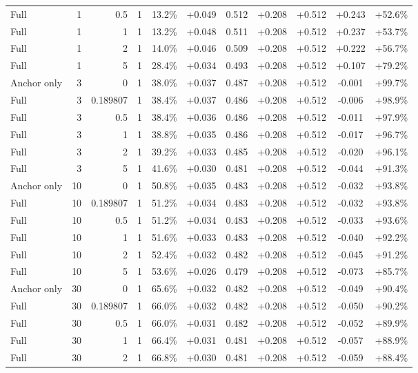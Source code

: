 \begin{table}[htbp]
\begin{tabular}{lrrrccccccc}
Full & 1 & 0.5 & 1 & 13.2\% & +0.049 & 0.512 & +0.208 & +0.512 & +0.243 & +52.6\% \\
Full & 1 & 1 & 1 & 13.2\% & +0.048 & 0.511 & +0.208 & +0.512 & +0.237 & +53.7\% \\
Full & 1 & 2 & 1 & 14.0\% & +0.046 & 0.509 & +0.208 & +0.512 & +0.222 & +56.7\% \\
Full & 1 & 5 & 1 & 28.4\% & +0.034 & 0.493 & +0.208 & +0.512 & +0.107 & +79.2\% \\
Anchor only & 3 & 0 & 1 & 38.0\% & +0.037 & 0.487 & +0.208 & +0.512 & -0.001 & +99.7\% \\
Full & 3 & 0.189807 & 1 & 38.4\% & +0.037 & 0.486 & +0.208 & +0.512 & -0.006 & +98.9\% \\
Full & 3 & 0.5 & 1 & 38.4\% & +0.036 & 0.486 & +0.208 & +0.512 & -0.011 & +97.9\% \\
Full & 3 & 1 & 1 & 38.8\% & +0.035 & 0.486 & +0.208 & +0.512 & -0.017 & +96.7\% \\
Full & 3 & 2 & 1 & 39.2\% & +0.033 & 0.485 & +0.208 & +0.512 & -0.020 & +96.1\% \\
Full & 3 & 5 & 1 & 41.6\% & +0.030 & 0.481 & +0.208 & +0.512 & -0.044 & +91.3\% \\
Anchor only & 10 & 0 & 1 & 50.8\% & +0.035 & 0.483 & +0.208 & +0.512 & -0.032 & +93.8\% \\
Full & 10 & 0.189807 & 1 & 51.2\% & +0.034 & 0.483 & +0.208 & +0.512 & -0.032 & +93.8\% \\
Full & 10 & 0.5 & 1 & 51.2\% & +0.034 & 0.483 & +0.208 & +0.512 & -0.033 & +93.6\% \\
Full & 10 & 1 & 1 & 51.6\% & +0.033 & 0.483 & +0.208 & +0.512 & -0.040 & +92.2\% \\
Full & 10 & 2 & 1 & 52.4\% & +0.032 & 0.482 & +0.208 & +0.512 & -0.045 & +91.2\% \\
Full & 10 & 5 & 1 & 53.6\% & +0.026 & 0.479 & +0.208 & +0.512 & -0.073 & +85.7\% \\
Anchor only & 30 & 0 & 1 & 65.6\% & +0.032 & 0.482 & +0.208 & +0.512 & -0.049 & +90.4\% \\
Full & 30 & 0.189807 & 1 & 66.0\% & +0.032 & 0.482 & +0.208 & +0.512 & -0.050 & +90.2\% \\
Full & 30 & 0.5 & 1 & 66.0\% & +0.031 & 0.482 & +0.208 & +0.512 & -0.052 & +89.9\% \\
Full & 30 & 1 & 1 & 66.4\% & +0.031 & 0.481 & +0.208 & +0.512 & -0.057 & +88.9\% \\
Full & 30 & 2 & 1 & 66.8\% & +0.030 & 0.481 & +0.208 & +0.512 & -0.059 & +88.4\% \\

\end{tabular}
\end{table}
